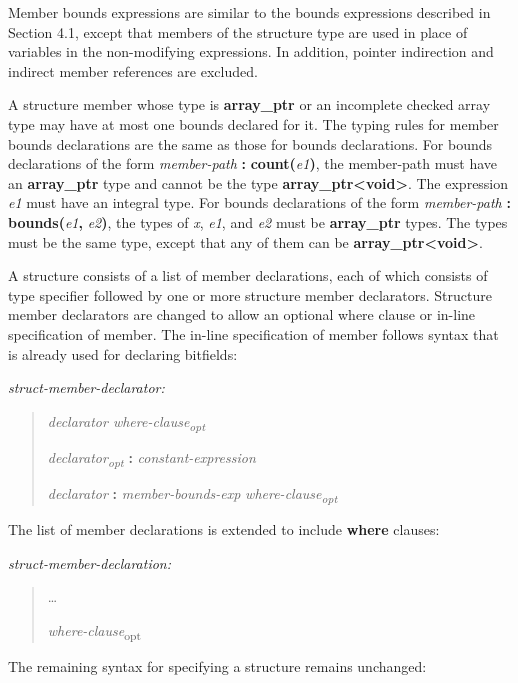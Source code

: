 \documentclass[]{article}
\begin{document}
Member bounds expressions are similar to the bounds expressions
described in Section 4.1, except that members of the structure type are
used in place of variables in the non-modifying expressions. In
addition, pointer indirection and indirect member references are
excluded.

A structure member whose type is \textbf{array\_ptr} or an incomplete
checked array type may have at most one bounds declared for it. The
typing rules for member bounds declarations are the same as those for
bounds declarations. For bounds declarations of the form
\emph{member-path} \textbf{:} \textbf{count(}\emph{e1}\textbf{)}, the
member-path must have an \textbf{array\_ptr} type and cannot be the type
\textbf{array\_ptr\textless{}void\textgreater{}}. The expression
\emph{e1} must have an integral type. For bounds declarations of the
form \emph{member-path} \textbf{:} \textbf{bounds(}\emph{e1}\textbf{,}
\emph{e2}\textbf{)}, the types of \emph{x}, \emph{e1}, and \emph{e2}
must be \textbf{array\_ptr} types. The types must be the same type,
except that any of them can be
\textbf{array\_ptr\textless{}void\textgreater{}}.

A structure consists of a list of member declarations, each of which
consists of type specifier followed by one or more structure member
declarators. Structure member declarators are changed to allow an
optional where clause or in-line specification of member. The in-line
specification of member follows syntax that is already used for
declaring bitfields:

\emph{struct-member-declarator:}

\begin{quote}
\emph{declarator where-clause\textsubscript{opt}}

\emph{declarator\textsubscript{opt}} \textbf{:}
\emph{constant-expression}

\emph{declarator} \textbf{:} \emph{member-bounds-exp}
\emph{where-clause\textsubscript{opt}}
\end{quote}

The list of member declarations is extended to include \textbf{where}
clauses:

\emph{struct-member-declaration:}

\begin{quote}
\ldots{}

\emph{where-clause}\textsubscript{opt}
\end{quote}

The remaining syntax for specifying a structure remains unchanged:
\end{document}
